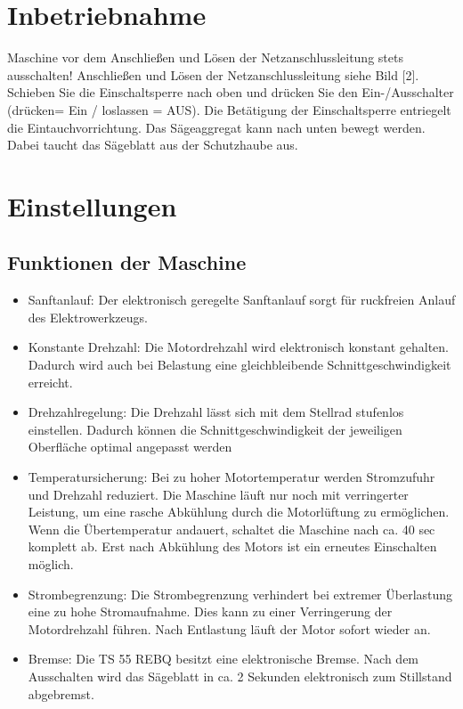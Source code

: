 \documentclass{\basedir/fablab-document}
\begin{document}
\section{Inbetriebnahme}
Maschine vor dem Anschließen und Lösen der Netzanschlussleitung stets ausschalten! Anschließen und Lösen der Netzanschlussleitung siehe Bild [2].
Schieben Sie die Einschaltsperre nach oben und drücken Sie den Ein-/Ausschalter (drücken= Ein / loslassen = AUS).
Die Betätigung der Einschaltsperre entriegelt die Eintauchvorrichtung. Das Sägeaggregat kann nach unten bewegt werden. Dabei taucht das Sägeblatt aus der Schutzhaube aus.

\section{Einstellungen}
\subsection{Funktionen der Maschine}
\begin{itemize}
\item Sanftanlauf: Der elektronisch geregelte Sanftanlauf sorgt für ruckfreien Anlauf des Elektrowerkzeugs.
\item Konstante Drehzahl: Die Motordrehzahl wird elektronisch konstant gehalten. Dadurch wird auch bei Belastung eine gleichbleibende Schnittgeschwindigkeit erreicht.
\item Drehzahlregelung: Die Drehzahl lässt sich mit dem Stellrad stufenlos einstellen. Dadurch können die Schnittgeschwindigkeit der jeweiligen Oberfläche optimal angepasst werden 
\item Temperatursicherung: Bei zu hoher Motortemperatur werden Stromzufuhr und Drehzahl reduziert. Die Maschine läuft nur noch mit verringerter Leistung, um eine rasche Abkühlung durch die Motorlüftung zu ermöglichen. Wenn die Übertemperatur andauert, schaltet die Maschine nach ca. 40 sec komplett ab. Erst nach Abkühlung des Motors ist ein erneutes Einschalten möglich.
\item Strombegrenzung: Die Strombegrenzung verhindert bei extremer Überlastung eine zu hohe Stromaufnahme. Dies kann zu einer Verringerung der Motordrehzahl führen. Nach Entlastung läuft der Motor sofort wieder an.
\item Bremse: Die TS 55 REBQ besitzt eine elektronische Bremse. Nach dem Ausschalten wird das Sägeblatt in ca. 2 Sekunden elektronisch zum Stillstand abgebremst.
\end{itemize}
\end{document}
